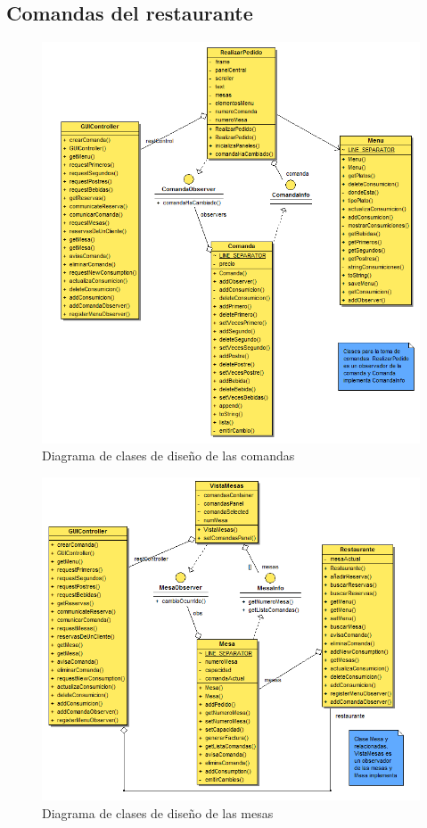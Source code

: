 \documentclass[spanish,a4paper,11pt, twoside]{report}	%
\begin{document}
		\subsection{Comandas del restaurante}
		\begin{figure}[!h]
		\centering
		\includegraphics[scale=0.5]{DCDcomandas.png}
		\caption{Diagrama de clases de diseño de las comandas}
		\end{figure}

		\begin{figure}[!h]
		\centering
		\includegraphics[scale=0.5]{DCDmesas.png}
		\caption{Diagrama de clases de diseño de las mesas}
		\end{figure}
\clearpage
\end{document}
